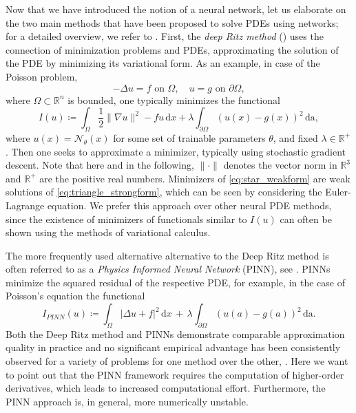\documentclass[12pt,openany]{book}
\newcommand{\R}{\mathbb{R}}
\theoremstyle{plainnormal}
\theoremstyle{remark}
\begin{document}
Now that we have introduced the notion of a neural network, let us elaborate on the two main methods that have been proposed to solve PDEs using networks; for a detailed overview, we refer to \cite{E_2021}. First, the \emph{deep Ritz method} (\cite{deepritzmethoddeep}) uses the connection of minimization problems and PDEs, approximating the solution of the PDE by minimizing its variational form. As an example, in case of the Poisson problem, \begin{equation}\label{eq:triangle_strongform}
-\Delta u = f \text{ on } \Omega, \quad u = g \text{ on } \partial \Omega,
\tag{$\triangle$}
\end{equation} where $\Omega \subset \R^n $ is bounded, one typically minimizes the functional \begin{equation}\label{eq:star_weakform}
    I(u) \coloneqq \int_\Omega \frac{1}{2} \|\nabla u\|^2 - fu \,\mathrm{d}x + \lambda\int_{\partial \Omega} (u(x)- g(x))^2\, \mathrm{da},\tag{$\star$}
\end{equation}
where $u(x) = \mathcal N_\theta(x)$ for some set of trainable parameters $\theta$, and fixed $\lambda\in \R^+$. Then one seeks to approximate a minimizer, typically using stochastic gradient descent. Note that here and in the following, $\|\cdot\|$ denotes the vector norm in $\R^3$ and $\R^+$ are the positive real numbers. Minimizers of \cref{eq:star_weakform} are weak solutions of \cref{eq:triangle_strongform}, which can be seen by considering the Euler-Lagrange equation. We prefer this approach over other neural PDE methods, since the existence of minimizers of functionals similar to $I(u)$ can often be shown using the methods of variational calculus.\par
The more frequently used alternative alternative to the Deep Ritz method is often referred to as a \emph{Physics Informed Neural Network} (PINN), see \cite{RAISSI2019686}. PINNs minimize the squared residual of the respective PDE, for example, in the case of Poisson's equation the functional
$$  I_{PINN}(u) \coloneqq \int_\Omega |\Delta u + f|^2 \,\mathrm{d}x\, +\, \lambda \int_{\partial\Omega}(u(a) - g(a))^2 \, \mathrm{da}  .$$
Both the Deep Ritz method and PINNs demonstrate comparable approximation quality in practice and no significant empirical advantage has been consistently observed for a variety of problems for one method over the other, \cite{yang2025numericalstudyhyperparameter}. 
Here we want to point out that the PINN framework requires the computation of higher-order derivatives, which leads to increased computational effort. Furthermore, the PINN approach is, in general, more numerically unstable.
\end{document}
